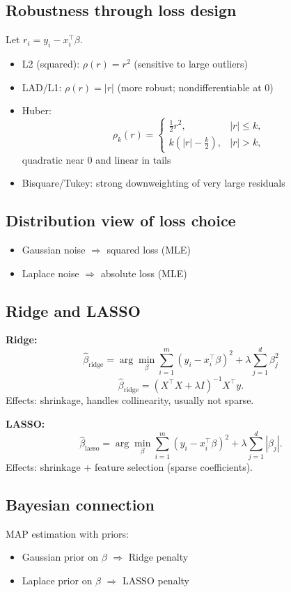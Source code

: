 \documentclass[11pt]{article}
\newcommand{\1}{\mathbf{1}}
\begin{document}
\subsection*{Robustness through loss design}
Let $r_i=y_i-x_i^\top\beta$.
\begin{itemize}
\item L2 (squared): $\rho(r)=r^2$ (sensitive to large outliers)
\item LAD/L1: $\rho(r)=|r|$ (more robust; nondifferentiable at 0)
\item Huber:
\[
\rho_k(r)=
\begin{cases}
\frac12r^2,& |r|\le k,\\
k\left(|r|-\frac{k}{2}\right),& |r|>k,
\end{cases}
\]
quadratic near 0 and linear in tails
\item Bisquare/Tukey: strong downweighting of very large residuals
\end{itemize}

\subsection*{Distribution view of loss choice}
\begin{itemize}
\item Gaussian noise $\Rightarrow$ squared loss (MLE)
\item Laplace noise $\Rightarrow$ absolute loss (MLE)
\end{itemize}

\subsection*{Ridge and LASSO}
\textbf{Ridge:}
\[
\hat\beta_{\text{ridge}}
=\arg\min_\beta\sum_{i=1}^m(y_i-x_i^\top\beta)^2+\lambda\sum_{j=1}^d\beta_j^2
\]
\[
\hat\beta_{\text{ridge}}=(X^\top X+\lambda I)^{-1}X^\top y.
\]
Effects: shrinkage, handles collinearity, usually not sparse.

\textbf{LASSO:}
\[
\hat\beta_{\text{lasso}}=
\arg\min_\beta\sum_{i=1}^m(y_i-x_i^\top\beta)^2+\lambda\sum_{j=1}^d|\beta_j|.
\]
Effects: shrinkage + feature selection (sparse coefficients).

\subsection*{Bayesian connection}
MAP estimation with priors:
\begin{itemize}
\item Gaussian prior on $\beta$ $\Rightarrow$ Ridge penalty
\item Laplace prior on $\beta$ $\Rightarrow$ LASSO penalty
\end{itemize}
\end{document}
